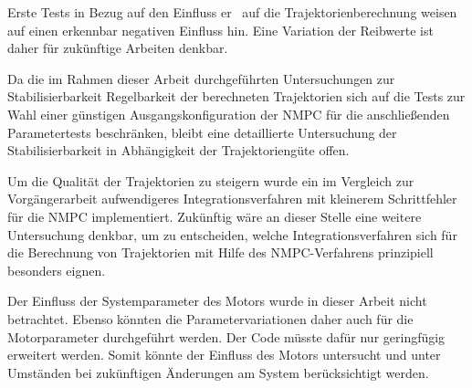 Erste Tests in Bezug auf den Einfluss er \crb\ auf die Trajektorienberechnung weisen auf einen erkennbar negativen Einfluss hin. Eine Variation der Reibwerte ist daher für zukünftige Arbeiten denkbar.

Da die im Rahmen dieser Arbeit durchgeführten Untersuchungen zur Stabilisierbarkeit \bzw Regelbarkeit der berechneten Trajektorien sich auf die Tests zur Wahl einer günstigen Ausgangskonfiguration der NMPC für die anschließenden Parametertests beschränken, bleibt eine detaillierte Untersuchung der Stabilisierbarkeit in Abhängigkeit der Trajektoriengüte offen.

Um die Qualität der Trajektorien zu steigern wurde ein im Vergleich zur Vorgängerarbeit aufwendigeres Integrationsverfahren mit kleinerem Schrittfehler für die NMPC implementiert. Zukünftig wäre an dieser Stelle eine weitere Untersuchung denkbar, um zu entscheiden, welche Integrationsverfahren sich für die Berechnung von Trajektorien mit Hilfe des NMPC-Verfahrens prinzipiell besonders eignen. 

Der Einfluss der Systemparameter des Motors wurde in dieser Arbeit nicht betrachtet.
Ebenso könnten die Parametervariationen daher auch für die Motorparameter durchgeführt werden.
Der Code müsste dafür nur geringfügig erweitert werden.
Somit könnte der Einfluss des Motors untersucht und unter Umständen bei zukünftigen Änderungen am System berücksichtigt werden.

